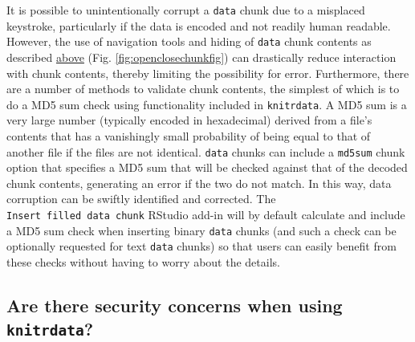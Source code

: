 It is possible to unintentionally corrupt a \texttt{data} chunk due to a misplaced keystroke, particularly if the data is encoded and not readily human readable. However, the use of navigation tools and hiding of \texttt{data} chunk contents as described \protect\hyperlink{readable}{above} (Fig. \ref{fig:openclosechunkfig}) can drastically reduce interaction with chunk contents, thereby limiting the possibility for error. Furthermore, there are a number of methods to validate chunk contents, the simplest of which is to do a MD5 sum check using functionality included in \texttt{knitrdata}. A MD5 sum is a very large number (typically encoded in hexadecimal) derived from a file's contents that has a vanishingly small probability of being equal to that of another file if the files are not identical. \texttt{data} chunks can include a \texttt{md5sum} chunk option that specifies a MD5 sum that will be checked against that of the decoded chunk contents, generating an error if the two do not match. In this way, data corruption can be swiftly identified and corrected. The \texttt{Insert\ filled\ data\ chunk} RStudio add-in will by default calculate and include a MD5 sum check when inserting binary \texttt{data} chunks (and such a check can be optionally requested for text \texttt{data} chunks) so that users can easily benefit from these checks without having to worry about the details.

\hypertarget{are-there-security-concerns-when-using-knitrdata}{%
\subsection{\texorpdfstring{Are there security concerns when using \texttt{knitrdata}?}{Are there security concerns when using knitrdata?}}\label{are-there-security-concerns-when-using-knitrdata}}

